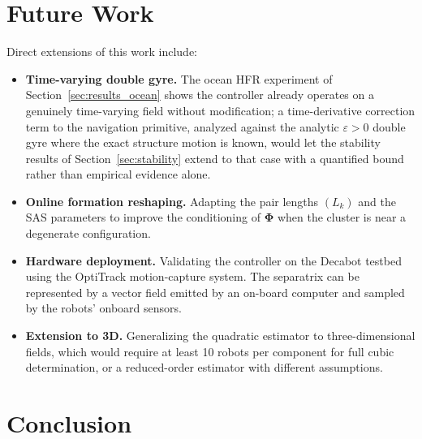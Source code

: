 \documentclass[lettersize,journal]{IEEEtran}
\begin{document}
\section{Future Work}
\label{sec:future}

Direct extensions of this work include:
\begin{itemize}
    \item \textbf{Time-varying double gyre.} The ocean HFR experiment of
          Section~\ref{sec:results_ocean} shows the controller already
          operates on a genuinely time-varying field without modification;
          a time-derivative correction term to the navigation primitive,
          analyzed against the analytic $\varepsilon > 0$ double gyre where
          the exact structure motion is known, would let the stability
          results of Section~\ref{sec:stability} extend to that case with
          a quantified bound rather than empirical evidence alone.
    \item \textbf{Online formation reshaping.} Adapting the pair lengths
          $(L_k)$ and the SAS parameters to improve the conditioning of
          $\boldsymbol{\Phi}$ when the cluster is near a degenerate
          configuration.
    \item \textbf{Hardware deployment.} Validating the controller on the
          Decabot testbed using the OptiTrack motion-capture system. The
          separatrix can be represented by a vector field emitted by an
          on-board computer and sampled by the robots' onboard sensors.
    \item \textbf{Extension to 3D.} Generalizing the quadratic estimator
          to three-dimensional fields, which would require at least 10 robots
          per component for full cubic determination, or a reduced-order
          estimator with different assumptions.
\end{itemize}


\section{Conclusion}
\label{sec:conclusion}
\end{document}
